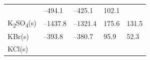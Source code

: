 \documentclass[
  9pt,
]{extbook}
\theoremstyle{definition}
\theoremstyle{definition}
\theoremstyle{definition}
\theoremstyle{remark}
\begin{document}
\begin{longtable}[]{@{}lllll@{}}
\begin{minipage}[t]{0.10\columnwidth}
\end{minipage} & \begin{minipage}[t]{0.19\columnwidth}\raggedright
--494.1\strut
\end{minipage} & \begin{minipage}[t]{0.20\columnwidth}\raggedright
--425.1\strut
\end{minipage} & \begin{minipage}[t]{0.18\columnwidth}\raggedright
102.1\strut
\end{minipage} & \begin{minipage}[t]{0.18\columnwidth}\raggedright
\strut
\end{minipage}\tabularnewline
\begin{minipage}[t]{0.10\columnwidth}\raggedright
K\textsubscript{2}SO\textsubscript{4}(s)\strut
\end{minipage} & \begin{minipage}[t]{0.19\columnwidth}\raggedright
--1437.8\strut
\end{minipage} & \begin{minipage}[t]{0.20\columnwidth}\raggedright
--1321.4\strut
\end{minipage} & \begin{minipage}[t]{0.18\columnwidth}\raggedright
175.6\strut
\end{minipage} & \begin{minipage}[t]{0.18\columnwidth}\raggedright
131.5\strut
\end{minipage}\tabularnewline
\begin{minipage}[t]{0.10\columnwidth}\raggedright
KBr(s)\strut
\end{minipage} & \begin{minipage}[t]{0.19\columnwidth}\raggedright
--393.8\strut
\end{minipage} & \begin{minipage}[t]{0.20\columnwidth}\raggedright
--380.7\strut
\end{minipage} & \begin{minipage}[t]{0.18\columnwidth}\raggedright
95.9\strut
\end{minipage} & \begin{minipage}[t]{0.18\columnwidth}\raggedright
52.3\strut
\end{minipage}\tabularnewline
\begin{minipage}[t]{0.10\columnwidth}\raggedright
KCl(s)\strut
\end{minipage} & \begin{minipage}[t]{0.19\columnwidth}\raggedright

\end{minipage}
\end{longtable}
\end{document}
